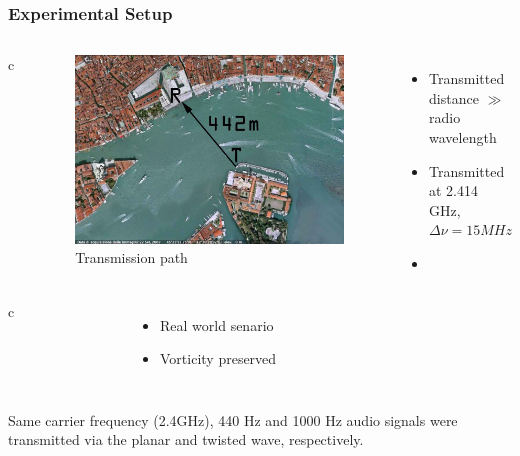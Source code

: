 \documentclass[xcolor=dvipsnames]{beamer}
\newenvironment{items}[1][]
{\begin{itemize}
    \ifthenelse{\isempty{#1}}
    {\setlength{\itemsep}{12pt}}{\setlength{\itemsep}{#1}}}
  {\end{itemize}}
\begin{document}
\begin{frame}
	\frametitle{Experimental Setup}
  \begin{columns}{c}
		\begin{figure}
      \includegraphics[width=\textwidth]{birdeyeview}
      \caption{Transmission path}
      \label{pic:birdeye}
		\end{figure}
		\begin{items}
		\item Transmitted distance $\gg$ radio wavelength
		\item Transmitted at 2.414 GHz, $\Delta \nu = 15MHz$
		\item 
		\end{items}
  \end{columns}
\end{frame}

\begin{frame}
  \begin{columns}{c}
		\begin{figure}
      \caption{}
      \label{}
		\end{figure}
		\begin{items}
		\item Real world senario
		\item Vorticity preserved
		\end{items}
  \end{columns}

Same carrier frequency (2.4GHz), 440 Hz and 1000 Hz audio signals were transmitted via the planar and twisted wave, respectively.
\end{frame}
\end{document}
